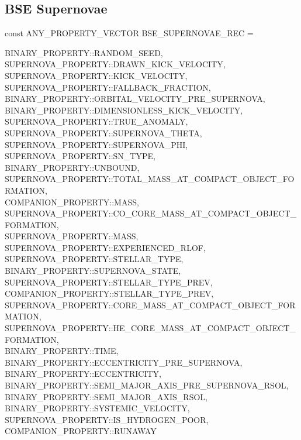 \newpage
\subsection{BSE Supernovae}\label{sec:BSESupernovae}

const ANY\_PROPERTY\_VECTOR BSE\_SUPERNOVAE\_REC = \lcb

\hfill
\begin{minipage}{\dimexpr\textwidth-2em}
    BINARY\_PROPERTY::RANDOM\_SEED, \\
    SUPERNOVA\_PROPERTY::DRAWN\_KICK\_VELOCITY, \\
    SUPERNOVA\_PROPERTY::KICK\_VELOCITY, \\
    SUPERNOVA\_PROPERTY::FALLBACK\_FRACTION, \\
    BINARY\_PROPERTY::ORBITAL\_VELOCITY\_PRE\_SUPERNOVA, \\
    BINARY\_PROPERTY::DIMENSIONLESS\_KICK\_VELOCITY, \\ 
    SUPERNOVA\_PROPERTY::TRUE\_ANOMALY, \\			
    SUPERNOVA\_PROPERTY::SUPERNOVA\_THETA, \\
    SUPERNOVA\_PROPERTY::SUPERNOVA\_PHI, \\
    SUPERNOVA\_PROPERTY::SN\_TYPE, \\
    BINARY\_PROPERTY::UNBOUND, \\
    SUPERNOVA\_PROPERTY::TOTAL\_MASS\_AT\_COMPACT\_OBJECT\_FORMATION, \\
    COMPANION\_PROPERTY::MASS, \\
    SUPERNOVA\_PROPERTY::CO\_CORE\_MASS\_AT\_COMPACT\_OBJECT\_FORMATION, \\
    SUPERNOVA\_PROPERTY::MASS, \\
    SUPERNOVA\_PROPERTY::EXPERIENCED\_RLOF, \\
    SUPERNOVA\_PROPERTY::STELLAR\_TYPE, \\
    BINARY\_PROPERTY::SUPERNOVA\_STATE, \\
    SUPERNOVA\_PROPERTY::STELLAR\_TYPE\_PREV, \\
    COMPANION\_PROPERTY::STELLAR\_TYPE\_PREV, \\
    SUPERNOVA\_PROPERTY::CORE\_MASS\_AT\_COMPACT\_OBJECT\_FORMATION, \\
    SUPERNOVA\_PROPERTY::HE\_CORE\_MASS\_AT\_COMPACT\_OBJECT\_FORMATION, \\
    BINARY\_PROPERTY::TIME, \\
    BINARY\_PROPERTY::ECCENTRICITY\_PRE\_SUPERNOVA, \\  
    BINARY\_PROPERTY::ECCENTRICITY, \\
    BINARY\_PROPERTY::SEMI\_MAJOR\_AXIS\_PRE\_SUPERNOVA\_RSOL, \\
    BINARY\_PROPERTY::SEMI\_MAJOR\_AXIS\_RSOL, \\
    BINARY\_PROPERTY::SYSTEMIC\_VELOCITY, \\
    SUPERNOVA\_PROPERTY::IS\_HYDROGEN\_POOR, \\
    COMPANION\_PROPERTY::RUNAWAY
\end{minipage}
\par\rcb{;}

